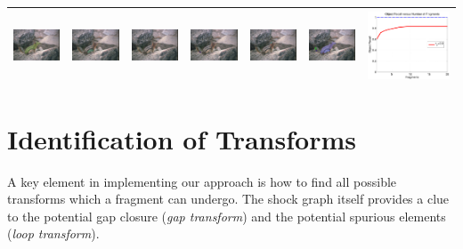 \documentclass[runningheads,a4paper]{llncs}
\begin{document}
\begin{table}[h!]
\begin{tabular}{|c | c | c | c | c | c | c |}
    \hline
    \includegraphics[width=0.14\linewidth]{figs/123074_top_1_fragments.jpg}&
    \includegraphics[width=0.14\linewidth]{figs/123074_top_2_fragments.jpg}&
    \includegraphics[width=0.14\linewidth]{figs/123074_top_3_fragments.jpg}&
    \includegraphics[width=0.14\linewidth]{figs/123074_top_4_fragments.jpg}&
    \includegraphics[width=0.14\linewidth]{figs/123074_top_5_fragments.jpg}&
    \includegraphics[width=0.14\linewidth]{figs/123074_top_20_fragments_montage.jpg}&
    \includegraphics[width=0.14\linewidth]{figs/123074_object_recall_vs_fragments.pdf} \\
    \hline
  \end{tabular}
\label{table:example_frag_measure}
\end{table}

\section{Identification of Transforms}

A key element in implementing our approach is how to find all possible transforms which a fragment can undergo. The shock graph itself provides a clue to the potential  gap closure ({\em gap transform}) and the potential spurious elements ({\em loop transform}). 
\end{document}
